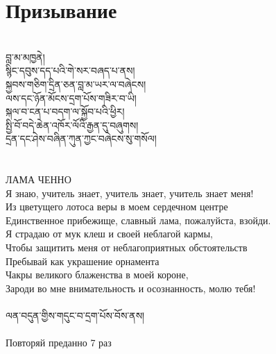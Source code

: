 \section{Призывание}
\\
\ti
བླ་མ་མཁྱནེ།\\
སྙིང་དབུས་དད་པའི་གེ་སར་བཞད་པ་ནས།\\
སྐྱབས་གཅིག་དྲིན་ཅན་བླ་མ་ཡར་ལ་བཞེངས།\\
ལས་དང་ཉོན་མོངས་དྲག་པོས་གཟིར་བ་ཡི།\\
སྐལ་བ་ངན་པ་བདག་ལ་སྐྱོབ་པའི་ཕྱིར།\\
སྤྱི་བོ་བདེ་ཆེན་འཁོར་ལོའི་རྒྱན་དུ་བཞུགས།\\
དྲན་དང་ཤེས་བཞིན་ཀུན་ཀྱང་བཞེངས་སུ་གསོལ།\\
\\
\\
\ru
ЛАМА ЧЕННО\\
Я знаю, учитель знает, учитель знает, учитель знает меня!\\
Из цветущего лотоса веры в моем сердечном центре \\
Единственное прибежище, славный лама, пожалуйста, взойди.\\
Я страдаю от мук клеш и своей неблагой кармы,\\
Чтобы защитить меня от неблагоприятных обстоятельств\\
Пребывай как украшение орнамента \\
Чакры великого блаженства в моей короне, \\
Зароди во мне внимательность и осознанность, молю тебя!\\
\\
\scriptsize \ti
ལན་བདུན་གྱིས་གདུང་བ་དྲག་པོས་བོས་ནས།\\
\\
\ru
Повторяй преданно 7 раз\\
\normalsize